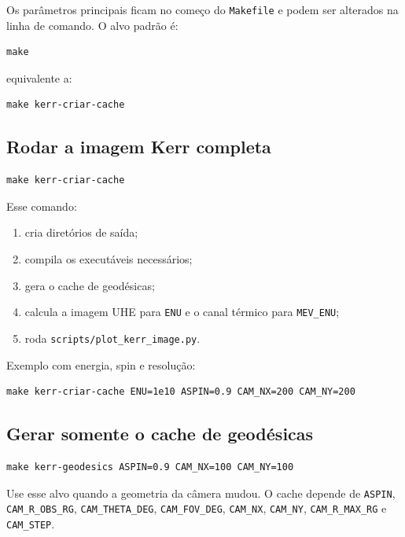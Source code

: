 \documentclass[11pt,a4paper]{article}
\begin{document}
Os parâmetros principais ficam no começo do \texttt{Makefile} e podem ser
alterados na linha de comando. O alvo padrão é:

\begin{verbatim}
make
\end{verbatim}

equivalente a:

\begin{verbatim}
make kerr-criar-cache
\end{verbatim}

\subsection{Rodar a imagem Kerr completa}

\begin{verbatim}
make kerr-criar-cache
\end{verbatim}

Esse comando:

\begin{enumerate}
  \item cria diretórios de saída;
  \item compila os executáveis necessários;
  \item gera o cache de geodésicas;
  \item calcula a imagem UHE para \texttt{ENU} e o canal térmico para
  \texttt{MEV\_ENU};
  \item roda \texttt{scripts/plot\_kerr\_image.py}.
\end{enumerate}

Exemplo com energia, spin e resolução:

\begin{verbatim}
make kerr-criar-cache ENU=1e10 ASPIN=0.9 CAM_NX=200 CAM_NY=200
\end{verbatim}

\subsection{Gerar somente o cache de geodésicas}

\begin{verbatim}
make kerr-geodesics ASPIN=0.9 CAM_NX=100 CAM_NY=100
\end{verbatim}

Use esse alvo quando a geometria da câmera mudou. O cache depende de
\texttt{ASPIN}, \texttt{CAM\_R\_OBS\_RG}, \texttt{CAM\_THETA\_DEG},
\texttt{CAM\_FOV\_DEG}, \texttt{CAM\_NX}, \texttt{CAM\_NY},
\texttt{CAM\_R\_MAX\_RG} e \texttt{CAM\_STEP}.
\end{document}
